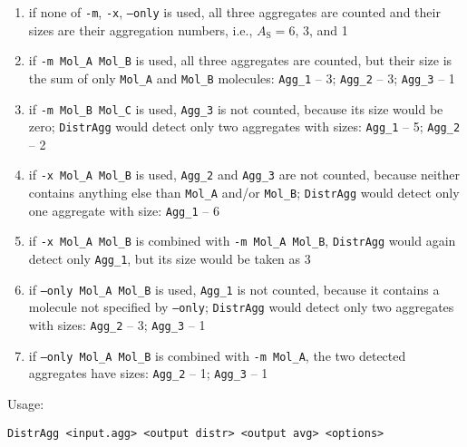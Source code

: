 \begin{enumerate}[nosep]
  \item if none of \texttt{-m}, \texttt{-x}, \texttt{--only} is used, all
    three aggregates are counted and their sizes are their aggregation
    numbers, i.e., $A_{\mathrm{S}}=6$, 3, and 1
  \item if \texttt{-m Mol\_A Mol\_B} is used, all three aggregates are
    counted, but their size is the sum of only \texttt{Mol\_A} and
    \texttt{Mol\_B} molecules: \texttt{Agg\_1} -- 3; \texttt{Agg\_2} -- 3;
    \texttt{Agg\_3} -- 1
  \item if \texttt{-m Mol\_B Mol\_C} is used, \texttt{Agg\_3} is not
    counted, because its size would be zero; \texttt{DistrAgg} would detect
    only two aggregates with sizes: \texttt{Agg\_1} -- 5; \texttt{Agg\_2} --
    2
  \item if \texttt{-x Mol\_A Mol\_B} is used, \texttt{Agg\_2} and
    \texttt{Agg\_3} are not counted, because neither contains anything else
    than \texttt{Mol\_A} and/or \texttt{Mol\_B}; \texttt{DistrAgg} would
    detect only one aggregate with size: \texttt{Agg\_1} -- 6
  \item if \texttt{-x Mol\_A Mol\_B} is combined with \texttt{-m Mol\_A
    Mol\_B}, \texttt{DistrAgg} would again detect only \texttt{Agg\_1}, but
    its size would be taken as 3
  \item if \texttt{--only Mol\_A Mol\_B} is used, \texttt{Agg\_1} is not
    counted, because it contains a molecule not specified by
    \texttt{--only}; \texttt{DistrAgg} would detect only two aggregates
    with sizes: \texttt{Agg\_2} -- 3; \texttt{Agg\_3} -- 1
  \item if \texttt{--only Mol\_A Mol\_B} is combined with \texttt{-m
    Mol\_A}, the two detected aggregates have sizes: \texttt{Agg\_2} -- 1;
    \texttt{Agg\_3} -- 1
\end{enumerate}

Usage:

\vspace{1em}
\noindent
\texttt{DistrAgg <input.agg> <output distr> <output avg> <options>}

